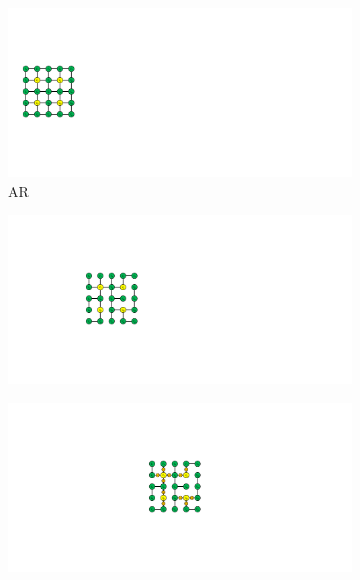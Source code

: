 \documentclass[preprint,10pt,5p,times,twocolumn]{elsarticle}
\begin{document}
%
\begin{figure}[t]
\centering
\begin{subfigure}[b]{0.2\linewidth}
    \centering
    \includegraphics[width=\linewidth]{interpolation_tree_1.pdf}
    \caption{AR}
    \label{fig:minimax_path:interpolation_tree_1}
\end{subfigure}
\hfill
\begin{subfigure}[b]{0.2\linewidth}
    \centering
    \includegraphics[width=\linewidth]{interpolation_tree_2.pdf}
    \caption{}
    \label{fig:minimax_path:interpolation_tree_2}
\end{subfigure}\hfill
\begin{subfigure}[b]{0.2\linewidth}
    \centering
    \includegraphics[width=\linewidth]{interpolation_tree_3.pdf}

\end{subfigure}
\end{figure}
\end{document}
